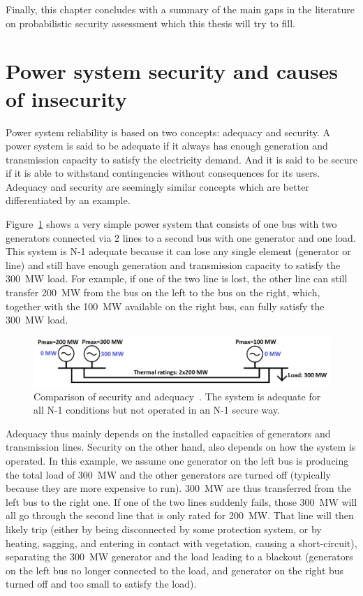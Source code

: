 Finally, this chapter concludes with a summary of the main gaps in the literature on probabilistic security assessment which this thesis will try to fill.



\section{Power system security and causes of insecurity}
\label{sec:Security_and_threats}

Power system reliability is based on two concepts: adequacy and security. A power system is said to be adequate if it always has enough generation and transmission capacity to satisfy the electricity demand. And it is said to be secure if it is able to withstand contingencies without consequences for its users. Adequacy and security are seemingly similar concepts which are better differentiated by an example.

Figure~\ref{fig:security_vs_adequacy} shows a very simple power system that consists of one bus with two generators connected via 2 lines to a second bus with one generator and one load. This system is N-1 adequate because it can lose any single element (generator or line) and still have enough generation and transmission capacity to satisfy the 300~MW load. For example, if one of the two line is lost, the other line can still transfer 200~MW from the bus on the left to the bus on the right, which, together with the 100~MW available on the right bus, can fully satisfy the 300~MW load.

\begin{figure}[h]
    \centering
    \includegraphics[width=\linewidth]{Figs/Security_vs_adequacy.png}
    \caption{Comparison of security and adequacy~\cite{adequacy_vs_security}. The system is adequate for all N-1 conditions but not operated in an N-1 secure way.}
    \label{fig:security_vs_adequacy}
\end{figure}

Adequacy thus mainly depends on the installed capacities of generators and transmission lines. Security on the other hand, also depends on how the system is operated. In this example, we assume one generator on the left bus is producing the total load of 300~MW and the other generators are turned off (typically because they are more expensive to run). 300~MW are thus transferred from the left bus to the right one. If one of the two lines suddenly fails, those 300~MW will all go through the second line that is only rated for 200~MW. That line will then likely trip (either by being disconnected by some protection system, or by heating, sagging, and entering in contact with vegetation, causing a short-circuit), separating the 300~MW generator and the load leading to a blackout (generators on the left bus no longer connected to the load, and generator on the right bus turned off and too small to satisfy the load).

